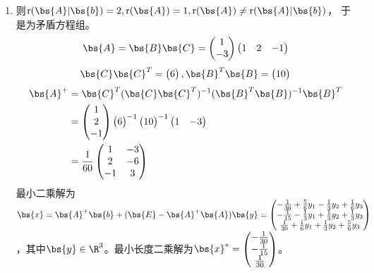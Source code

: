 \documentclass[12pt, a4paper, oneside, UTF8]{ctexbook}
\begin{document}
\begin{solution}
\begin{enumerate}[label=(\arabic*)]
        \item  则$\mathrm{r}(\bs{A}|\bs{b})=2,\mathrm{r}(\bs{A})=1,\mathrm{r}(\bs{A}) \neq \mathrm{r}(\bs{A}|\bs{b})$，
        于是为矛盾方程组。
        \begin{align*}
            \bs{A}=\bs{B}\bs{C}=\begin{pmatrix}
                1\\
                -3
            \end{pmatrix}\begin{pmatrix}
                1&2&-1
            \end{pmatrix}
        \end{align*}
        \begin{align*}
            \bs{C}\bs{C}^T=\begin{pmatrix}
                6
            \end{pmatrix},\bs{B}^T\bs{B}=\begin{pmatrix}
                10
            \end{pmatrix}
        \end{align*}
        \begin{align*}
            \bs{A}^+&=\bs{C}^T(\bs{C}\bs{C}^T)^{-1}(\bs{B}^T\bs{B})^{-1}\bs{B}^T\\
            &=\begin{pmatrix}
                1\\
                2\\
                -1
            \end{pmatrix}\begin{pmatrix}
                6
            \end{pmatrix}^{-1}\begin{pmatrix}
                10
            \end{pmatrix}^{-1}\begin{pmatrix}
                1&-3
            \end{pmatrix}\\
            &=\frac{1}{60}\begin{pmatrix}
                1&-3\\
                2&-6\\
                -1&3
            \end{pmatrix}
        \end{align*}
        最小二乘解为$\bs{x}=\bs{A}^+\bs{b}+(\bs{E}-\bs{A}^+\bs{A})\bs{y}
        =\begin{pmatrix}
            -\frac{1}{30}+\frac{5}{6}y_1-\frac{1}{3}y_2+\frac{1}{6}y_3\\
            -\frac{1}{15}-\frac{1}{3}y_1+\frac{1}{3}y_2+\frac{1}{3}y_3\\
            \frac{1}{30}+\frac{1}{6}y_1+\frac{1}{3}y_2+\frac{5}{6}y_3
        \end{pmatrix}$，其中$\bs{y}\in \R^3$。最小长度二乘解为$\bs{x}^{*}=\begin{pmatrix}
            -\frac{1}{30}\\
            -\frac{1}{15}\\
            \frac{1}{30}
        \end{pmatrix}$。


\end{enumerate}
\end{solution}
\end{document}
